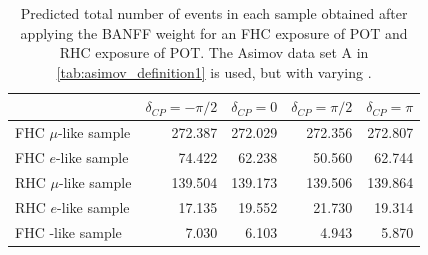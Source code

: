 \begin{table}[H]
\center
\begin{tabular} { | l ||r | r | r | r | }
	\hline
	&	$\delta_{CP}=-\pi/2$	&	$\delta_{CP}=0$	&	$\delta_{CP}=\pi/2$	&	$\delta_{CP}=\pi$	\\ \hline\hline
	FHC $\mu$-like sample			& 272.387 & 272.029 & 272.356 & 272.807 \\ \hline
	FHC $e$-like sample				&  74.422 &  62.238 &  50.560 &  62.744 \\ \hline
	RHC $\mu$-like sample			& 139.504 & 139.173 & 139.506 & 139.864 \\ \hline	
	RHC $e$-like sample				&  17.135 &  19.552 &  21.730 &  19.314 \\ \hline
	FHC \nueCConepi{}-like sample	&   7.030 &   6.103 &   4.943 &   5.870 \\ \hline
\end{tabular}
\caption{
Predicted total number of events in each sample obtained after applying the BANFF weight for an FHC exposure of \TotalPotNu{} POT and RHC exposure of \TotalPotNuBar{} POT. The Asimov data set A in \ref{tab:asimov_definition1} is used, but with varying \deltacp.
}
\label{tab:events_asimov_a_dcp_var_1re}
\end{table}
